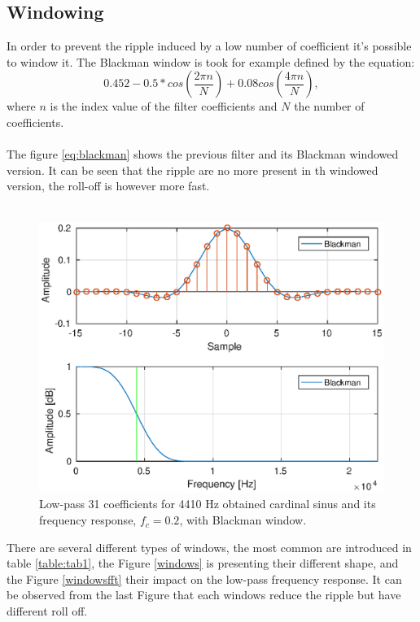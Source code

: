 \documentclass[twoside,twocolumn]{article}
\begin{document}
\subsection{Windowing}
In order to prevent the ripple induced by a low number of coefficient it's possible to window it. The Blackman window is took for example defined by the equation:
\begin{equation}
 0.452 - 0.5*cos(\frac{2\pi n}{N}) + 0.08cos(\frac{4\pi n}{N}),
\label{eq:blackman}
\end{equation}
where $n$ is the index value of the filter coefficients and $N$ the number of coefficients.\\ \\
The figure \ref{eq:blackman} shows the previous filter and its Blackman windowed version. It can be seen that the ripple are no more present in th windowed version, the roll-off is however more fast.\\ \\
\begin{figure}[h!]
	\centering
	\includegraphics[scale=0.45]{./images/lp_31pts_fc02_blackman.eps}
	\caption{Low-pass 31 coefficients for 4410 Hz obtained cardinal sinus and its frequency response, $f_c=0.2$, with Blackman window.}
	\label{blackman}
\end{figure}
 There are several different types of windows, the most common are introduced in table \ref{table:tab1}, the Figure \ref{windows} is presenting their different shape, and the Figure  \ref{windowsfft} their impact on the low-pass frequency response. It can be observed from the last Figure that each windows reduce the ripple but have different roll off.
 
\end{document}
